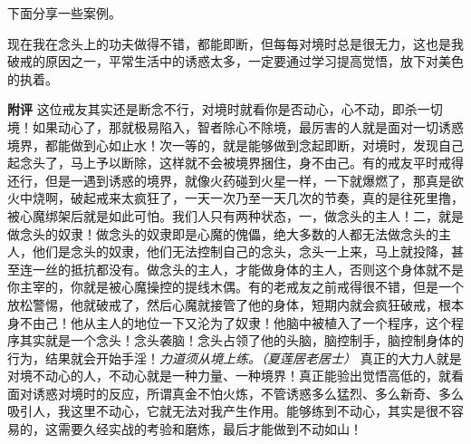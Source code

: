 下面分享一些案例。

\begin{case}
    现在我在念头上的功夫做得不错，都能即断，但每每对境时总是很无力，这也是我破戒的原因之一，平常生活中的诱惑太多，一定要通过学习提高觉悟，放下对美色的执着。

    \textbf{附评} 这位戒友其实还是断念不行，对境时就看你是否动心，心不动，即杀一切境！如果动心了，那就极易陷入，智者除心不除境，最厉害的人就是面对一切诱惑境界，都能做到心如止水！次一等的，就是能够做到念起即断，对境时，发现自己起念头了，马上予以断除，这样就不会被境界捆住，身不由己。有的戒友平时戒得还行，但是一遇到诱惑的境界，就像火药碰到火星一样，一下就爆燃了，那真是欲火中烧啊，破起戒来太疯狂了，一天一次乃至一天几次的节奏，真的是往死里撸，被心魔绑架后就是如此可怕。我们人只有两种状态，一，做念头的主人！二，就是做念头的奴隶！做念头的奴隶即是心魔的傀儡，绝大多数的人都无法做念头的主人，他们是念头的奴隶，他们无法控制自己的念头，念头一上来，马上就投降，甚至连一丝的抵抗都没有。做念头的主人，才能做身体的主人，否则这个身体就不是你主宰的，你就是被心魔操控的提线木偶。有的老戒友之前戒得很不错，但是一个放松警惕，他就破戒了，然后心魔就接管了他的身体，短期内就会疯狂破戒，根本身不由己！他从主人的地位一下又沦为了奴隶！他脑中被植入了一个程序，这个程序其实就是一个念头！念头袭脑！念头占领了他的头脑，脑控制手，脑控制身体的行为，结果就会开始手淫！\textit{力道须从境上练。（夏莲居老居士）} 真正的大力人就是对境不动心的人，不动心就是一种力量、一种境界！真正能验出觉悟高低的，就看面对诱惑对境时的反应，所谓真金不怕火炼，不管诱惑多么猛烈、多么新奇、多么吸引人，我这里不动心，它就无法对我产生作用。能够练到不动心，其实是很不容易的，这需要久经实战的考验和磨炼，最后才能做到不动如山！
\end{case}

